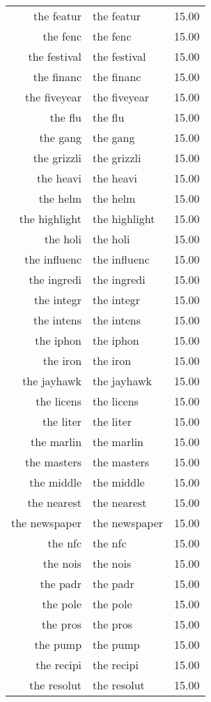 \begin{table}[ht]
\begin{tabular}{rlr}
  the featur & the featur & 15.00 \\ 
  the fenc & the fenc & 15.00 \\ 
  the festival & the festival & 15.00 \\ 
  the financ & the financ & 15.00 \\ 
  the fiveyear & the fiveyear & 15.00 \\ 
  the flu & the flu & 15.00 \\ 
  the gang & the gang & 15.00 \\ 
  the grizzli & the grizzli & 15.00 \\ 
  the heavi & the heavi & 15.00 \\ 
  the helm & the helm & 15.00 \\ 
  the highlight & the highlight & 15.00 \\ 
  the holi & the holi & 15.00 \\ 
  the influenc & the influenc & 15.00 \\ 
  the ingredi & the ingredi & 15.00 \\ 
  the integr & the integr & 15.00 \\ 
  the intens & the intens & 15.00 \\ 
  the iphon & the iphon & 15.00 \\ 
  the iron & the iron & 15.00 \\ 
  the jayhawk & the jayhawk & 15.00 \\ 
  the licens & the licens & 15.00 \\ 
  the liter & the liter & 15.00 \\ 
  the marlin & the marlin & 15.00 \\ 
  the masters & the masters & 15.00 \\ 
  the middle & the middle & 15.00 \\ 
  the nearest & the nearest & 15.00 \\ 
  the newspaper & the newspaper & 15.00 \\ 
  the nfc & the nfc & 15.00 \\ 
  the nois & the nois & 15.00 \\ 
  the padr & the padr & 15.00 \\ 
  the pole & the pole & 15.00 \\ 
  the pros & the pros & 15.00 \\ 
  the pump & the pump & 15.00 \\ 
  the recipi & the recipi & 15.00 \\ 
  the resolut & the resolut & 15.00 \\ 

\end{tabular}
\end{table}
